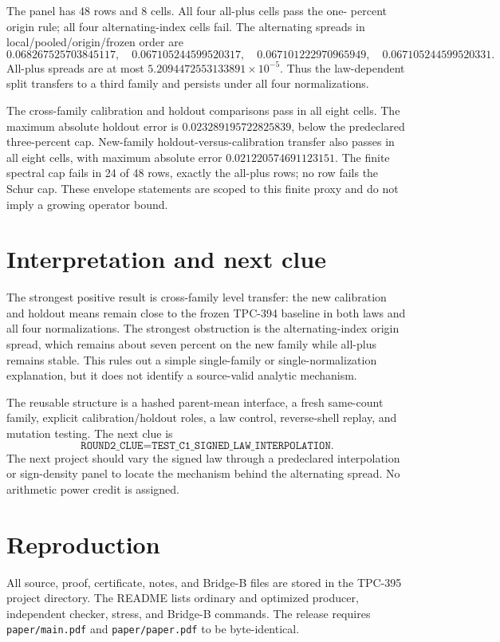 \documentclass[10pt]{article}
\begin{document}
The panel has 48 rows and 8 cells.  All four all-plus cells pass the one-
percent origin rule; all four alternating-index cells fail.  The alternating
spreads in local/pooled/origin/frozen order are
\[
0.068267525703845117,\quad
0.067105244599520317,\quad
0.067101222970965949,\quad
0.067105244599520331.
\]
All-plus spreads are at most $5.2094472553133891\times10^{-5}$.  Thus the
law-dependent split transfers to a third family and persists under all four
normalizations.

The cross-family calibration and holdout comparisons pass in all eight cells.
The maximum absolute holdout error is
$0.023289195722825839$, below the predeclared three-percent cap.  New-family
holdout-versus-calibration transfer also passes in all eight cells, with
maximum absolute error $0.021220574691123151$.  The finite spectral cap fails
in 24 of 48 rows, exactly the all-plus rows; no row fails the Schur cap.
These envelope statements are scoped to this finite proxy and do not imply a
growing operator bound.

\section{Interpretation and next clue}

The strongest positive result is cross-family level transfer: the new
calibration and holdout means remain close to the frozen TPC-394 baseline in
both laws and all four normalizations.  The strongest obstruction is the
alternating-index origin spread, which remains about seven percent on the new
family while all-plus remains stable.  This rules out a simple single-family
or single-normalization explanation, but it does not identify a source-valid
analytic mechanism.

The reusable structure is a hashed parent-mean interface, a fresh same-count
family, explicit calibration/holdout roles, a law control, reverse-shell
replay, and mutation testing.  The next clue is
\[
 \texttt{ROUND2\_CLUE=TEST\_C1\_SIGNED\_LAW\_INTERPOLATION}.
\]
The next project should vary the signed law through a predeclared interpolation
or sign-density panel to locate the mechanism behind the alternating spread.
No arithmetic power credit is assigned.

\section*{Reproduction}

All source, proof, certificate, notes, and Bridge-B files are stored in the
TPC-395 project directory.  The README lists ordinary and optimized producer,
independent checker, stress, and Bridge-B commands.  The release requires
\texttt{paper/main.pdf} and \texttt{paper/paper.pdf} to be byte-identical.
\end{document}
